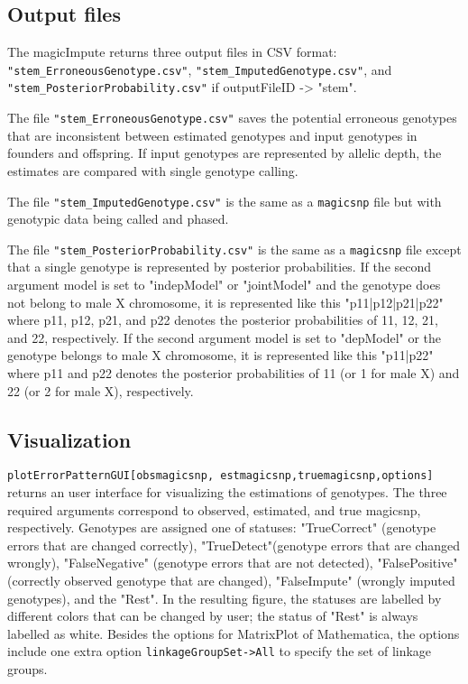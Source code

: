 \documentclass[12pt]{article}
\begin{document}
\subsection{Output files}

The magicImpute returns three output files in CSV format: \verb|"stem_ErroneousGenotype.csv"|, \verb|"stem_ImputedGenotype.csv"|, and \verb|"stem_PosteriorProbability.csv"| if outputFileID -> "stem". 

The file \verb|"stem_ErroneousGenotype.csv"| saves the potential erroneous genotypes that are inconsistent between estimated genotypes and input genotypes in founders and offspring.  If input genotypes are represented by allelic depth, the estimates are compared with single genotype calling.

The file \verb|"stem_ImputedGenotype.csv"| is the same as a \verb|magicsnp| file but with genotypic data being called and phased. 

The file \verb|"stem_PosteriorProbability.csv"| is the same as  a \verb|magicsnp| file  except that a single genotype is represented by posterior probabilities. If the second argument model is set to "indepModel" or "jointModel" and the genotype does not belong to male X chromosome, it is represented like this "p11|p12|p21|p22" where p11, p12, p21, and p22 denotes the posterior probabilities of 11, 12, 21, and 22, respectively. If the second argument model is set to "depModel" or the genotype belongs to male X chromosome, it is represented like this "p11|p22" where p11 and p22 denotes the posterior probabilities of 11 (or 1 for male X) and 22 (or 2 for male X), respectively.  


\subsection{Visualization}

\verb|plotErrorPatternGUI[obsmagicsnp, estmagicsnp,truemagicsnp,options]| returns an user interface for visualizing the estimations of genotypes. The three required arguments correspond to observed, estimated, and true magicsnp, respectively. Genotypes are assigned one of statuses: "TrueCorrect" (genotype errors that are changed correctly), "TrueDetect"(genotype errors that are changed wrongly), "FalseNegative" (genotype errors that are not detected), "FalsePositive" (correctly observed genotype that are changed), "FalseImpute" (wrongly imputed genotypes), and the "Rest". In the resulting figure, the statuses are labelled  by different colors that can be changed by user; the status of "Rest" is always labelled  as white. Besides the options for MatrixPlot of Mathematica, the options include one extra option \verb|linkageGroupSet->All| to specify the set of linkage groups. 
\end{document}
